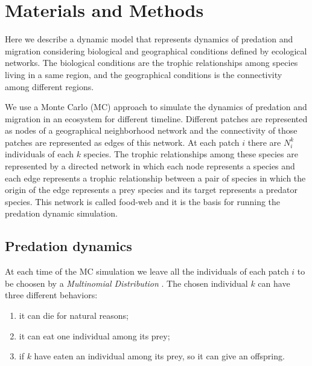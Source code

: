 \section{Materials and Methods}

Here we describe a dynamic model that represents dynamics of predation and migration considering biological and geographical conditions defined by ecological networks. The biological conditions are the trophic relationships among species living in a same region, and the geographical conditions is the connectivity among different regions. 


We use a Monte Carlo (MC) approach to simulate the dynamics of predation and migration in an ecosystem for different timeline. Different patches are represented as nodes of a geographical neighborhood network and the connectivity of those patches are represented as edges of this network. At each patch $i$ there are $N_{i}^{k}$ individuals of each $k$ species. The trophic relationships among these species are represented by a directed network in which each node represents a species and each edge represents a trophic relationship between a pair of species in which the origin of the edge represents a prey species and its target represents a predator species. This network is called food-web and it is the basis for running the predation dynamic simulation.

\subsection{Predation dynamics}

At each time of the MC simulation we leave all the individuals of each patch $i$ to be choosen by a \emph{Multinomial Distribution} \cite{levin1981representation}. The chosen individual $k$ can have three different behaviors: 
\begin{enumerate}
\item it can die for natural reasons; 
\item it can eat one individual among its prey; 
\item if $k$ have eaten an individual among its prey, so it can give an offspring. 
\end{enumerate}

